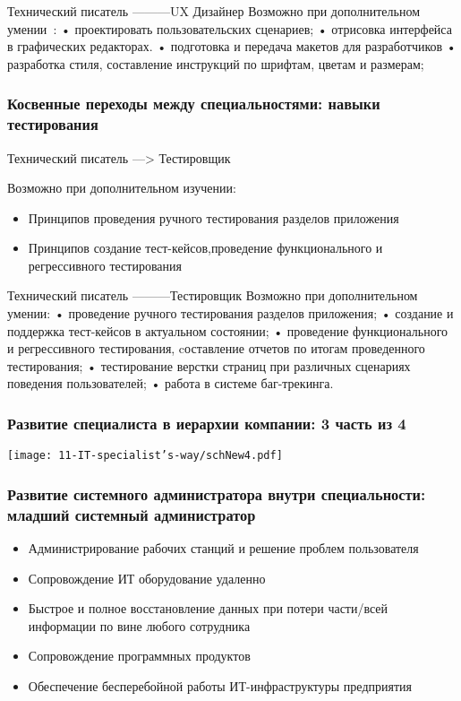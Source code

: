 \documentclass{../industrial-development}
\begin{document}
\lecturenotes

Технический писатель ---------UX Дизайнер
Возможно при дополнительном умении~\cite{rab}:
•	проектировать пользовательских сценариев;
•	отрисовка интерфейса в графических редакторах.
•	подготовка и передача макетов для разработчиков
•	разработка стиля, составление инструкций по шрифтам, цветам и размерам;

\begin{frame} \frametitle{Косвенные переходы между специальностями: навыки тестирования}
\begin{block}{Технический писатель ---> Тестировщик}

Возможно при дополнительном изучении:
  \end{block}
\begin{itemize}
  \item Принципов проведения ручного тестирования разделов приложения
  \item Принципов создание тест-кейсов,проведение функционального и регрессивного тестирования
  \end{itemize}
\end{frame}

\lecturenotes


Технический писатель ---------Тестировщик
Возможно при дополнительном умении:
•	проведение ручного тестирования разделов приложения;
•	создание и поддержка тест-кейсов в актуальном состоянии;
•	проведение функционального и регрессивного тестирования, cоставление отчетов по итогам проведенного тестирования;
•	тестирование верстки страниц при различных сценариях поведения пользователей;
•	работа в системе баг-трекинга.




\begin{frame} \frametitle{Развитие  специалиста в иерархии компании: 3 часть из 4 }
  \centerline{\texttt{[image: 11-IT-specialist's-way/schNew4.pdf]}}
\end{frame}


\begin{frame} \frametitle{Развитие системного администратора внутри специальности: младший системный администратор }
  \begin{itemize}
  \item   Администрирование рабочих станций и решение проблем пользователя
  \item  Сопровождение ИТ оборудование удаленно
  \item Быстрое и полное восстановление данных при потери части/всей информации по вине любого сотрудника
 \item Сопровождение программных продуктов
 \item Обеспечение бесперебойной работы ИТ-инфраструктуры предприятия
  \end{itemize}
\end{frame}
\end{document}
